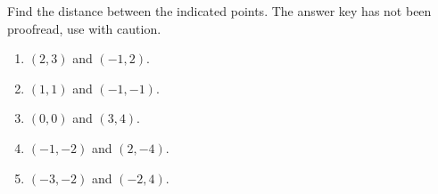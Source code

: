 Find the distance between the indicated points. The answer key has not been proofread, use with caution.
\begin{multicols}{2}
\begin{enumerate}[ref={\fcProblemRef}]
\item $(2,3)$ and $(-1, 2)$.

\item $(1,1)$ and $(-1, -1)$.

\item $(0,0)$ and $(3, 4)$.

\item $(-1,-2)$ and $(2, -4)$.

\item \label{problemDistanceBetween(-3,-2)and(-2,4)} $(-3,-2)$ and $(-2, 4)$.

\end{enumerate}
\end{multicols}